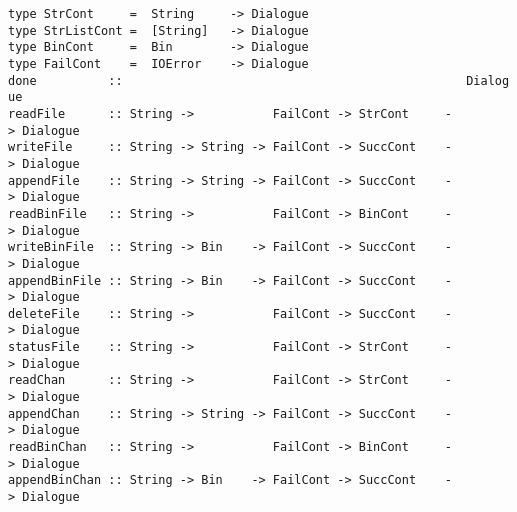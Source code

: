 \mbox{\tt type\ StrCont\ \ \ \ \ =\ \ String\ \ \ \ \ ->\ Dialogue}\\
\mbox{\tt type\ StrListCont\ =\ \ [String]\ \ \ ->\ Dialogue}\\
\mbox{\tt type\ BinCont\ \ \ \ \ =\ \ Bin\ \ \ \ \ \ \ \ ->\ Dialogue}\\
\mbox{\tt type\ FailCont\ \ \ \ =\ \ IOError\ \ \ \ ->\ Dialogue}
%
%
%
%
%
%
\eprogB\noindent\bprogB
\mbox{\tt done\ \ \ \ \ \ \ \ \ \ ::\ \ \ \ \ \ \ \ \ \ \ \ \ \ \ \ \ \ \ \ \ \ \ \ \ \ \ \ \ \ \ \ \ \ \ \ \ \ \ \ \ \ \ \ \ \ \ \ Dialogue}\\
\mbox{\tt readFile\ \ \ \ \ \ ::\ String\ ->\ \ \ \ \ \ \ \ \ \ \ FailCont\ ->\ StrCont\ \ \ \ \ ->\ Dialogue}\\
\mbox{\tt writeFile\ \ \ \ \ ::\ String\ ->\ String\ ->\ FailCont\ ->\ SuccCont\ \ \ \ ->\ Dialogue}\\
\mbox{\tt appendFile\ \ \ \ ::\ String\ ->\ String\ ->\ FailCont\ ->\ SuccCont\ \ \ \ ->\ Dialogue}\\
\mbox{\tt readBinFile\ \ \ ::\ String\ ->\ \ \ \ \ \ \ \ \ \ \ FailCont\ ->\ BinCont\ \ \ \ \ ->\ Dialogue}\\
\mbox{\tt writeBinFile\ \ ::\ String\ ->\ Bin\ \ \ \ ->\ FailCont\ ->\ SuccCont\ \ \ \ ->\ Dialogue}\\
\mbox{\tt appendBinFile\ ::\ String\ ->\ Bin\ \ \ \ ->\ FailCont\ ->\ SuccCont\ \ \ \ ->\ Dialogue}\\
\mbox{\tt deleteFile\ \ \ \ ::\ String\ ->\ \ \ \ \ \ \ \ \ \ \ FailCont\ ->\ SuccCont\ \ \ \ ->\ Dialogue}\\
\mbox{\tt statusFile\ \ \ \ ::\ String\ ->\ \ \ \ \ \ \ \ \ \ \ FailCont\ ->\ StrCont\ \ \ \ \ ->\ Dialogue}\\
\mbox{\tt readChan\ \ \ \ \ \ ::\ String\ ->\ \ \ \ \ \ \ \ \ \ \ FailCont\ ->\ StrCont\ \ \ \ \ ->\ Dialogue}\\
\mbox{\tt appendChan\ \ \ \ ::\ String\ ->\ String\ ->\ FailCont\ ->\ SuccCont\ \ \ \ ->\ Dialogue}\\
\mbox{\tt readBinChan\ \ \ ::\ String\ ->\ \ \ \ \ \ \ \ \ \ \ FailCont\ ->\ BinCont\ \ \ \ \ ->\ Dialogue}\\
\mbox{\tt appendBinChan\ ::\ String\ ->\ Bin\ \ \ \ ->\ FailCont\ ->\ SuccCont\ \ \ \ ->\ Dialogue}\\
